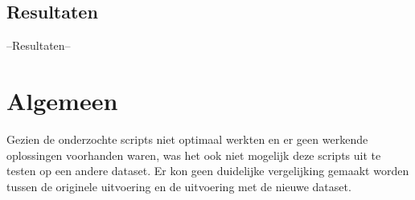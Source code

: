 \lipsum[1]

\subsection{Resultaten}

--Resultaten--

\section{Algemeen}

Gezien de onderzochte scripts niet optimaal werkten en er geen werkende oplossingen voorhanden waren, was het ook niet mogelijk deze scripts uit te testen op een andere dataset. Er kon geen duidelijke vergelijking gemaakt worden tussen de originele uitvoering en de uitvoering met de nieuwe dataset.


